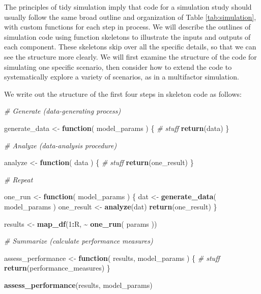 \documentclass[
]{book}
\newenvironment{Shaded}{\begin{snugshade}}{\end{snugshade}}
\newcommand{\CommentTok}[1]{\textcolor[rgb]{0.56,0.35,0.01}{\textit{#1}}}
\newcommand{\ControlFlowTok}[1]{\textcolor[rgb]{0.13,0.29,0.53}{\textbf{#1}}}
\newcommand{\DecValTok}[1]{\textcolor[rgb]{0.00,0.00,0.81}{#1}}
\newcommand{\FunctionTok}[1]{\textcolor[rgb]{0.13,0.29,0.53}{\textbf{#1}}}
\newcommand{\NormalTok}[1]{#1}
\newcommand{\OtherTok}[1]{\textcolor[rgb]{0.56,0.35,0.01}{#1}}
\newcommand{\SpecialCharTok}[1]{\textcolor[rgb]{0.81,0.36,0.00}{\textbf{#1}}}
\begin{document}
The principles of tidy simulation imply that code for a simulation study should usually follow the same broad outline and organization of Table \ref{tab:simulation}, with custom functions for each step in process.
We will describe the outlines of simulation code using function skeletons to illustrate the inputs and outputs of each component.
These skeletons skip over all the specific details, so that we can see the structure more clearly.
We will first examine the structure of the code for simulating one specific scenario, then consider how to extend the code to systematically explore a variety of scenarios, as in a multifactor simulation.

We write out the structure of the first four steps in skeleton code as follows:

\begin{Shaded}
\begin{Highlighting}[]
\CommentTok{\# Generate (data{-}generating process)}

\NormalTok{generate\_data }\OtherTok{\textless{}{-}} \ControlFlowTok{function}\NormalTok{( model\_params ) \{}
  \CommentTok{\# stuff}
  \FunctionTok{return}\NormalTok{(data)}
\NormalTok{\}}

\CommentTok{\# Analyze (data{-}analysis procedure)}

\NormalTok{analyze }\OtherTok{\textless{}{-}} \ControlFlowTok{function}\NormalTok{( data ) \{}
  \CommentTok{\# stuff}
  \FunctionTok{return}\NormalTok{(one\_result)}
\NormalTok{\}}

\CommentTok{\# Repeat}

\NormalTok{one\_run }\OtherTok{\textless{}{-}} \ControlFlowTok{function}\NormalTok{( model\_params ) \{}
\NormalTok{  dat }\OtherTok{\textless{}{-}} \FunctionTok{generate\_data}\NormalTok{( model\_params )}
\NormalTok{  one\_result }\OtherTok{\textless{}{-}} \FunctionTok{analyze}\NormalTok{(dat)}
  \FunctionTok{return}\NormalTok{(one\_result)}
\NormalTok{\}}

\NormalTok{results }\OtherTok{\textless{}{-}} \FunctionTok{map\_df}\NormalTok{(}\DecValTok{1}\SpecialCharTok{:}\NormalTok{R, }\SpecialCharTok{\textasciitilde{}} \FunctionTok{one\_run}\NormalTok{( params ))}

\CommentTok{\# Summarize (calculate performance measures)}

\NormalTok{assess\_performance }\OtherTok{\textless{}{-}} \ControlFlowTok{function}\NormalTok{( results, model\_params ) \{}
  \CommentTok{\# stuff}
  \FunctionTok{return}\NormalTok{(performance\_measures)}
\NormalTok{\}}

\FunctionTok{assess\_performance}\NormalTok{(results, model\_params)}
\end{Highlighting}
\end{Shaded}
\end{document}
